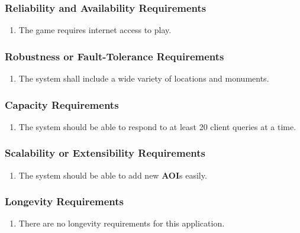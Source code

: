 \documentclass[titlepage]{article}
\begin{document}
		\subsubsection{Reliability and Availability Requirements}
		\label{ssub:reliability_and_availability_requirements}
		\begin{enumerate}[{PR}1. ]
			\item
			The game requires internet access to play.
		\end{enumerate}
		
		\subsubsection{Robustness or Fault-Tolerance Requirements}
		\label{ssub:robustness_or_fault_tolerance_requirements}
		\begin{enumerate}[{PR}1. ]
			\item 
			The system shall include a wide variety of locations and monuments.
		\end{enumerate}
		
		\subsubsection{Capacity Requirements}
		\label{ssub:capacity_requirements}
		\begin{enumerate}[{PR}1. ]
			\item 
			The system should be able to respond to at least 20 client queries at a time.
		\end{enumerate}
		
		\subsubsection{Scalability or Extensibility Requirements}
		\label{ssub:scalability_or_extensibility_requirements}
		\begin{enumerate}
			\item
			The system should be able to add new \textbf{AOI}s easily.
		\end{enumerate}
		
		\subsubsection{Longevity Requirements}
		\label{ssub:longevity_requirements}
		\begin{enumerate}[{PR}1. ]
			\item There are no longevity requirements for this application.
		\end{enumerate}
		
\end{document}
